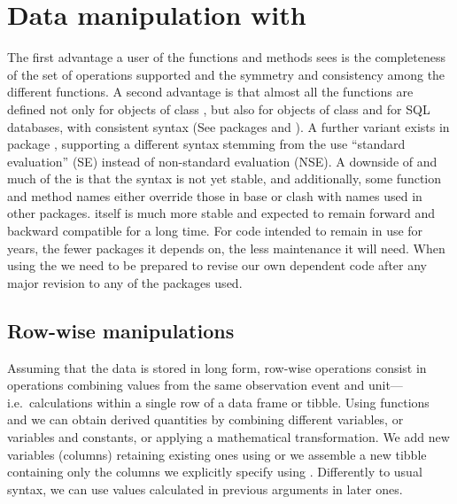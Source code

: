 \documentclass[krantz2]{krantz}\usepackage{knitr}%
\begin{document}
\section{Data manipulation with }

\begin{warningbox}
The first advantage a user of the  functions and methods sees is the completeness of the set of operations supported and the symmetry and consistency among the different functions. A second advantage is that almost all the functions are defined not only for objects of class , but also for objects of class  and for SQL databases, with consistent syntax (See packages  and ). A further variant exists in package , supporting a different syntax stemming from the use ``standard evaluation'' (SE) instead of non-standard evaluation (NSE). A downside of  and much of the  is that the syntax is not yet stable, and additionally, some function and method names either override those in base \Rlang or clash with names used in other packages. \Rlang itself is much more stable and expected to remain forward and backward compatible for a long time. For code intended to remain in use for years, the fewer packages it depends on, the less maintenance it will need. When using the  we need to be prepared to revise our own dependent code after any major revision to any of the packages used.
\end{warningbox}

\subsection{Row-wise manipulations}

Assuming that the data is stored in long form, row-wise operations consist in operations combining values from the same observation event and unit---i.e.\ calculations within a single row of a data frame or tibble. Using functions  and  we can obtain derived quantities by combining different variables, or variables and constants, or applying a mathematical transformation. We add new variables (columns) retaining existing ones using  or we assemble a new tibble containing only the columns we explicitly specify using . Differently to usual \Rlang syntax, we can use values calculated in previous arguments in later ones.
\end{document}
